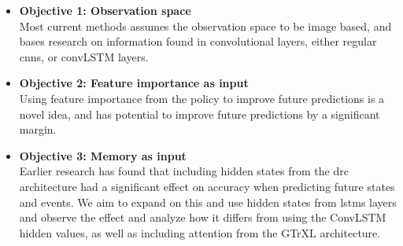 \documentclass[UKenglish]{uiomasterthesis}
\begin{document}
\begin{itemize}

    \item \textbf{Objective 1: Observation space}\\
        Most current methods assumes the observation space to be image based, and bases research on information found in convolutional layers, either regular \acp{cnn}, or convLSTM layers.

    \item \textbf{Objective 2: Feature importance as input}\\
        Using feature importance from the policy to improve future predictions is a novel idea, and has potential to improve future predictions by a significant margin.

    \item \textbf{Objective 3: Memory as input}\\
        Earlier research has found that including hidden states from the \ac{drc} architecture had a significant effect on accuracy when predicting future states and events. We aim to expand on this and use hidden states from \acp{lstm} layers and observe the effect and analyze how it differs from using the ConvLSTM hidden values, as well as including attention from the GTrXL architecture.

\end{itemize}
\end{document}
